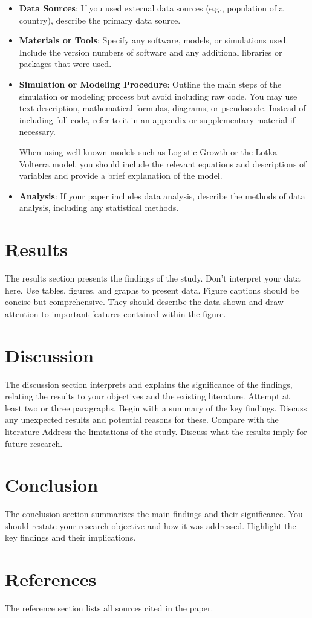 \documentclass[a4paper,12pt]{article}
\begin{document}
\begin{itemize}
    \item \textbf{Data Sources}: If you used external data sources (e.g., population of a country), describe the primary data source.
    \item \textbf{Materials or Tools}: Specify any software, models, or simulations used. Include the version numbers of software and any additional libraries or packages that were used.
    \item \textbf{Simulation or Modeling Procedure}: Outline the main steps of the simulation or modeling process but avoid including raw code. You may use text description, mathematical formulas, diagrams, or pseudocode. Instead of including full code, refer to it in an appendix or supplementary material if necessary.
    
    When using well-known models such as Logistic Growth or the Lotka-Volterra model, you should include the relevant equations and descriptions of variables and provide a brief explanation of the model.
    \item \textbf{Analysis}: If your paper includes data analysis, describe the methods of data analysis, including any statistical methods.
\end{itemize}

\section{Results}
The results section presents the findings of the study. Don't interpret your data here. Use tables, figures, and graphs to present data. Figure captions should be concise but comprehensive. They should describe the data shown and draw attention to important features contained within the figure.

\section{Discussion}
The discussion section interprets and explains the significance of the findings, relating the results to your objectives and the existing literature. Attempt at least two or three paragraphs. Begin with a summary of the key findings. Discuss any unexpected results and potential reasons for these. Compare with the literature \autocite{barraquand2017lotka} Address the limitations of the study. Discuss what the results imply for future research. 

\section{Conclusion}
The conclusion section summarizes the main findings and their significance. You should restate your research objective and how it was addressed. Highlight the key findings and their implications.

\section{References}
The reference section lists all sources cited in the paper.
\printbibliography
\end{document}
